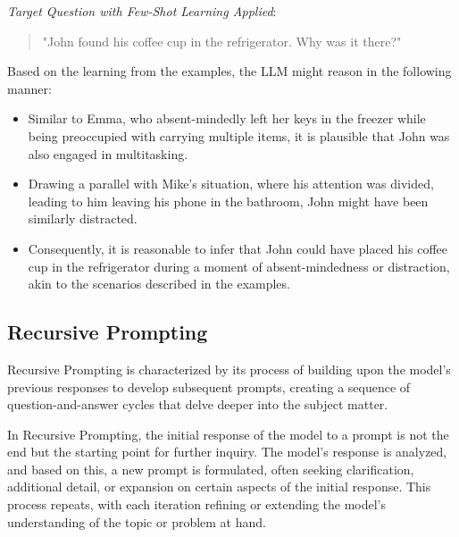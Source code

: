 \documentclass{article}
\begin{document}
\textit{Target Question with Few-Shot Learning Applied}:
\begin{quote}
    "John found his coffee cup in the refrigerator. Why was it there?"
\end{quote}
Based on the learning from the examples, the LLM might reason in the following manner:
\begin{itemize}
    \item Similar to Emma, who absent-mindedly left her keys in the freezer while being preoccupied with carrying multiple items, it is plausible that John was also engaged in multitasking.
    \item Drawing a parallel with Mike's situation, where his attention was divided, leading to him leaving his phone in the bathroom, John might have been similarly distracted.
    \item Consequently, it is reasonable to infer that John could have placed his coffee cup in the refrigerator during a moment of absent-mindedness or distraction, akin to the scenarios described in the examples.
\end{itemize}


\subsection{Recursive Prompting}

Recursive Prompting is characterized by its process of building upon the model's previous responses to develop subsequent prompts, creating a sequence of question-and-answer cycles that delve deeper into the subject matter.

In Recursive Prompting, the initial response of the model to a prompt is not the end but the starting point for further inquiry. The model's response is analyzed, and based on this, a new prompt is formulated, often seeking clarification, additional detail, or expansion on certain aspects of the initial response. This process repeats, with each iteration refining or extending the model's understanding of the topic or problem at hand.
\end{document}
